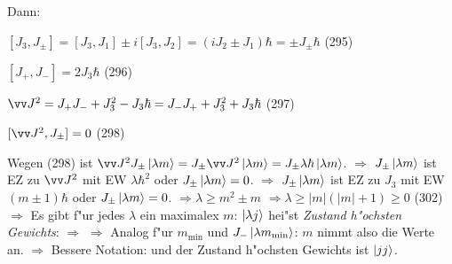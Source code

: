 \documentclass[a4paper]{scrartcl}
\begin{document}
{Dann:
\begin{aaufz}
\item $[J_3, J_{\pm}] = [J_3, J_1 ] \pm i [J_3, J_2] = (i J_2 \pm J_1) \hbar = \pm J_{\pm} \hbar$ \hfill (295)
\item $[J_+, J_-] = 2 J_3 \hbar$ \hfill (296)
\item $\vv J^2 = J_+ J_- + J_3^2 - J_3 \hbar = J_- J_+ + J_3^2 + J_3 \hbar$ \hfill (297) 
\item $[\vv J^2, J_{\pm}] = 0$ \hfill (298)
\end{aaufz}
\setcounter{equation}{298}
Wegen (298) ist $\vv J^2 J_{\pm} \Ket{ \lambda m} = J_{\pm} \vv J^2 \Ket{ \lambda m} = J_{\pm} \lambda \hbar \ket{\lambda m}$. $\Longrightarrow$ $J_\pm \ket{\lambda m }$ ist EZ zu $\vv J^2$ mit EW $\lambda \hbar^2$ oder $J_\pm \Ket {\lambda m} = 0$.
$\Longrightarrow$ $J_\pm \Ket{\lambda m}$ ist EZ zu $J_3$ mit EW $(m \pm 1) \hbar$ oder $J_\pm \Ket{\lambda m} = 0$.
$\Longrightarrow \lambda \geq m^2 \pm m$ $\Longrightarrow \lambda \geq \vert m \vert ( \vert m \vert + 1) \geq 0$ \hfill (302)
\setcounter{equation}{302}
$\Longrightarrow$ Es gibt f"ur jedes $\lambda$ ein maximalex $m$:
$\Ket{\lambda j}$ hei"st \emph{Zustand h"ochsten Gewichts}:
$\Longrightarrow$
$\Longrightarrow$
Analog f"ur $m_{\mathrm{min}}$ und $J_- \Ket{ \lambda m_{\mathrm{min}}}$:
$m$ nimmt also die Werte
an. $\Longrightarrow$
Bessere Notation:
und der Zustand h"ochsten Gewichts ist $\Ket{ jj}$.

}
\end{document}
